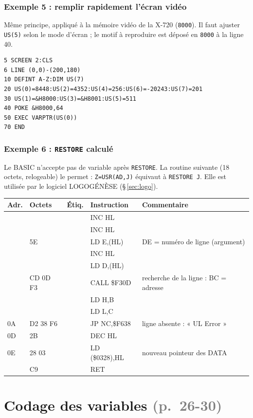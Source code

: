 \documentclass[a4paper,10pt]{article}
\makeatletter
\newcommand{\hex}[1]{\texttt{#1}}
\newcommand{\pg}[1]{\texorpdfstring{\textcolor{gray}{\small(p.~#1)}}{}}
\newenvironment{asm}
  {\small\begin{longtable}{@{}>{\ttfamily}l>{\ttfamily}l>{\ttfamily}l>{\ttfamily}l>{\raggedright\arraybackslash}p{6.2cm}@{}}
   \toprule
   \normalfont\bfseries Adr. & \normalfont\bfseries Octets & \normalfont\bfseries Étiq. & \normalfont\bfseries Instruction & \textbf{Commentaire}\\
   \midrule\endhead
   \bottomrule\endfoot}
  {\end{longtable}}
\makeatother
\begin{document}
\subsubsection*{Exemple 5 : remplir rapidement l'écran vidéo}
Même principe, appliqué à la mémoire vidéo de la X-720 (\hex{8000}). Il faut
ajuster \texttt{US(5)} selon le mode d'écran ; le motif à reproduire est
déposé en \hex{8000} à la ligne 40.
\begin{verbatim}
5 SCREEN 2:CLS
6 LINE (0,0)-(200,180)
10 DEFINT A-Z:DIM US(7)
20 US(0)=8448:US(2)=4352:US(4)=256:US(6)=-20243:US(7)=201
30 US(1)=&H8000:US(3)=&H8001:US(5)=511
40 POKE &H8000,64
50 EXEC VARPTR(US(0))
70 END
\end{verbatim}

\subsubsection*{Exemple 6 : \texttt{RESTORE} calculé}
Le BASIC n'accepte pas de variable après \texttt{RESTORE}. La routine
suivante (18 octets, relogeable) le permet : \texttt{Z=USR(AD,J)} équivaut
à \texttt{RESTORE J}. Elle est utilisée par le logiciel LOGOGÉNÈSE
(§\,\ref{sec:logo}).

\begin{asm}
00 & 23       & & INC HL       & \\
01 & 23       & & INC HL       & \\
02 & 5E       & & LD E,(HL)    & DE = numéro de ligne (argument) \\
03 & 23       & & INC HL       & \\
04 & 56       & & LD D,(HL)    & \\
05 & CD 0D F3 & & CALL \$F30D  & recherche de la ligne : BC = adresse \\
08 & 60       & & LD H,B       & \\
09 & 69       & & LD L,C       & \\
0A & D2 38 F6 & & JP NC,\$F638 & ligne absente : « UL Error » \\
0D & 2B       & & DEC HL       & \\
0E & 22 28 03 & & LD (\$0328),HL & nouveau pointeur des DATA \\
11 & C9       & & RET          & \\
\end{asm}

\section{Codage des variables \pg{26-30}}
\end{document}
